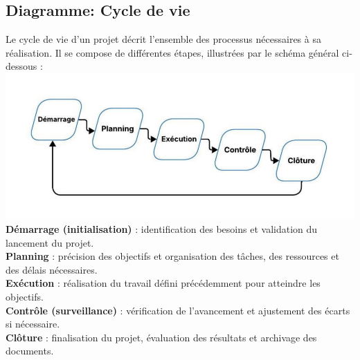 \documentclass{conception_detaillee}
\begin{document}
\begin{itemize}[label=\textbullet]
\section{Diagramme: Cycle de vie}
Le cycle de vie d’un projet décrit l’ensemble des processus nécessaires à sa
réalisation. Il se compose de différentes étapes, illustrées par le schéma général
ci-dessous :
\noindent\includegraphics[width=0.8\paperwidth]{images/cycle_de_vie.png}
\textbf{Démarrage (initialisation)} : identification des besoins et validation du
lancement du projet.\\
\textbf{Planning} : précision des objectifs et organisation des tâches, des ressources et des délais nécessaires.\\
\textbf{Exécution} : réalisation du travail défini précédemment pour atteindre les
objectifs.\\
\textbf{Contrôle (surveillance)} : vérification de l’avancement et ajustement des écarts
si nécessaire.\\
\textbf{Clôture} : finalisation du projet, évaluation des résultats et archivage des
documents.
\newpage

\end{itemize}
\end{document}
